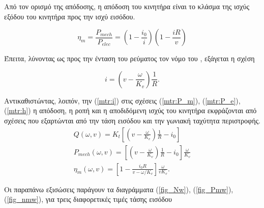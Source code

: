Από τον ορισμό της απόδοσης, η απόδοση του κινητήρα είναι το κλάσμα της ισχύς 
εξόδου του κινητήρα προς την ισχύ εισόδου.

\begin{equation}
    \eta_{m} = \frac{P_{mech}}{P_{elec}} = \left(1 - \frac{i_0}{i} \right) 
    \left(1 - \frac{iR}{v} \right)
    \label{mtr:h}
\end{equation}

Έπειτα, λύνοντας ως προς την ένταση του ρεύματος τον νόμο του , 
εξάγεται η σχέση 

\begin{equation}
    i = \left( v - \frac{\omega}{K_v} \right) \frac{1}{R}.
    \label{mtr:i}
\end{equation}

Αντικαθιστώντας, λοιπόν, την (\ref{mtr:i}) στις σχέσεις (\ref{mtr:P_m}), 
(\ref{mtr:P_e}), (\ref{mtr:h}) η απόδοση, η ροπή και η αποδιδόμενη ισχύς του 
κινητήρα εκφράζονται από σχέσεις που εξαρτώνται από την τάση εισόδου και την 
γωνιακή ταχύτητα περιστροφής.
\begin{gather*}
    Q(\omega, v) = K_t \left[ \left( v - \frac{\omega}{K_v} \right) \frac{1}{R} 
    - i_0 \right]\\
    P_{mech}(\omega, v) = \left[ \left( v - \frac{\omega}{K_v} \right) 
    \frac{1}{R} - i_0 \right] \frac{\omega}{K_v}\\
    \eta_{m}(\omega, v) = \left[ 1 - \frac{i_0 R}{v - \omega/K_v} \right] 
    \frac{\omega}{vK_v}.
\end{gather*}

Οι παραπάνω εξισώσεις παράγουν τα διαγράμματα (\ref{fig_Nw}), (\ref{fig_Pmw}), 
(\ref{fig_nmw}), για τρεις διαφορετικές τιμές τάσης εισόδου

